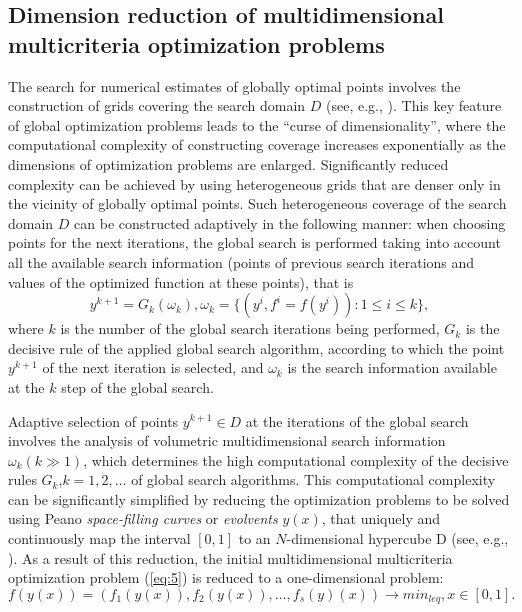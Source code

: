 \documentclass[smallextended]{svjour3}       %
\begin{document}
\subsection{Dimension reduction of multidimensional multicriteria optimization problems}

The search for numerical estimates of globally optimal points involves the construction of grids covering the search domain $D$ (see, e.g., \cite{c17,c18,c19,c20,c21,c22,c23,c24,c25}). This key feature of global optimization problems leads to the ``curse of dimensionality'', where the computational complexity of constructing coverage increases exponentially as the dimensions of optimization problems are enlarged. Significantly reduced complexity can be achieved by using heterogeneous grids that are denser only in the vicinity of globally optimal points. Such heterogeneous coverage of the search domain $D$ can be constructed adaptively in the following manner: when choosing points for the next iterations, the global search is performed taking into account all the available search information (points of previous search iterations and values of the optimized function at these points), that is
\begin{equation}\label{eq:9}
y^{k+1}=G_k(\omega_k), \omega_k=\{(y^i,f^i=f(y^i)): 1 \leq i \leq k \},
\end{equation}
where $k$ is the number of the global search iterations being performed, $G_k$ is the decisive rule of the applied global search algorithm, according to which the point $y^{k+1}$ of the next iteration is selected, and $\omega_k$ is the search information available at the $k$ step of the global search.

Adaptive selection of points $y^{k+1} \in D$ at the iterations of the global search involves the analysis of volumetric multidimensional search information $\omega_k (k \gg 1)$, which determines the high computational complexity of the decisive rules $G_k$,$k=1,2,\dots$ of global search algorithms. This computational complexity can be significantly simplified by reducing the optimization problems to be solved using Peano \textit{space-filling curves} or \textit{evolvents} $y(x)$, that uniquely and continuously map the interval $[0,1]$ to an $N$-dimensional hypercube D (see, e.g., \cite{c17,c18,c23}). As a result of this reduction, the initial multidimensional multicriteria optimization problem (\ref{eq:5}) is reduced to a one-dimensional problem:
\begin{equation}\label{eq:10}
f(y(x)) = (f_1(y(x)), f_2(y(x)), \dots , f_s(y)(x)) \to min_{leq},  x \in [0,1].
\end{equation}
\end{document}
